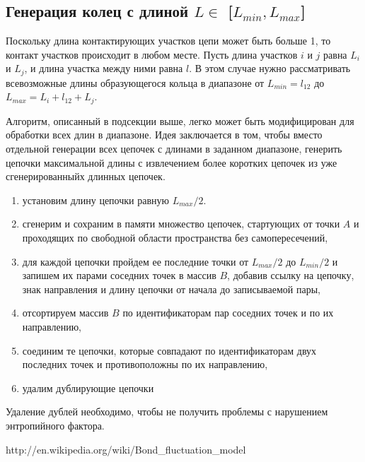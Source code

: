 \documentclass[tikz,a4paper]{scrartcl} %
\begin{document}
\subsection*{Генерация колец с длиной $L \in$ [$L_{min}, L_{max}$]}
Поскольку длина контактирующих участков цепи может быть больше 1, то контакт участков происходит в любом месте. Пусть длина участков $i$ и $j$ равна $L_i$ и $L_j$, и длина участка между ними равна $l$. В этом случае нужно рассматривать всевозможные длины образующегося кольца в диапазоне от $L_{min} = l_{12}$ до $L_{max} = L_i + l_{12} + L_j$. 

Алгоритм, описанный в подсекции выше, легко может быть модифицирован для обработки всех длин в диапазоне. Идея заключается в том, чтобы вместо отдельной генерации всех цепочек с длинами в заданном диапазоне, генерить цепочки максимальной длины с извлечением более коротких цепочек из уже сгенерированныйх длинных цепочек.

\begin{enumerate}
\item установим длину цепочки равную $L_{max}/2$.
\item сгенерим и сохраним в памяти множество цепочек, стартующих от точки $A$ и проходящих по свободной области пространства без самопересечений,
\item для каждой цепочки пройдем ее последние точки от $L_{max}/2$ до $L_{min}/2$ и запишем их парами соседних точек в массив $B$, добавив ссылку на цепочку, знак направления и длину цепочки от начала до записываемой пары,
\item отсортируем массив $B$ по идентификаторам пар соседних точек и по их направлению,
\item соединим те цепочки, которые совпадают по идентификаторам двух последних точек и противоположны по их направлению,
\item удалим дублирующие цепочки
\end{enumerate}

Удаление дублей необходимо, чтобы не получить проблемы с нарушением энтропийного фактора. 

\begin{thebibliography}{99}
 http://en.wikipedia.org/wiki/Bond\_fluctuation\_model
\end{thebibliography}
\end{document}
